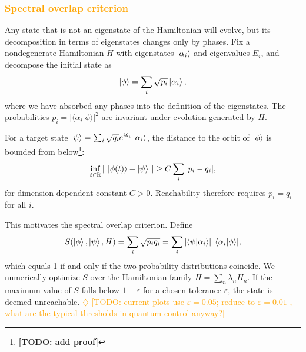 \documentclass[aps,prx,reprint,superscriptaddress,footnote, twocolumn,notitlepage]{revtex4-2}
\newcommand{\ko}[1]{\textcolor{orange}{#1}}
\newcommand{\todoko}[1]{\ko{$\diamondsuit$ #1}}
\begin{document}

\subsubsection{\ko{Spectral overlap criterion}}
Any state that is not an eigenstate of the Hamiltonian will evolve, but its decomposition in terms of eigenstates changes only by phases. Fix a nondegenerate Hamiltonian $H$ with eigenstates $\ket{\alpha_i}$ and eigenvalues $E_i$, and decompose the initial state as
\begin{equation}
    \ket{\phi} = \sum_i \sqrt{p_i} \ket{\alpha_i},
\end{equation}
where we have absorbed any phases into the definition of the eigenstates. The probabilities $p_i = |\langle \alpha_i | \phi \rangle|^2$ are invariant under evolution generated by $H$.

For a target state $\ket{\psi} = \sum_i \sqrt{q_i} e^{i\theta_i} \ket{\alpha_i}$, the distance to the orbit of $\ket{\phi}$ is bounded from below\footnote{\textbf{[TODO: add proof]}}:
\begin{equation}
    \inf_{t \in \mathbb{R}} \| \ket{\phi(t)} - \ket{\psi} \| \geq C \sum_i |p_i - q_i|,
\end{equation}
for dimension-dependent constant $C > 0$. Reachability therefore requires $p_i = q_i$ for all $i$.

This motivates the spectral overlap criterion. Define
\begin{equation}
    S(\ket{\phi}, \ket{\psi}, H) = \sum_i \sqrt{p_i q_i} = \sum_i |\langle \psi | \alpha_i \rangle| \, |\langle \alpha_i | \phi \rangle|,
\end{equation}
which equals 1 if and only if the two probability distributions coincide. We numerically optimize $S$ over the Hamiltonian family $H = \sum_n \lambda_n H_n$. If the maximum value of $S$ falls below $1 - \varepsilon$ for a chosen tolerance $\varepsilon$, the state is deemed unreachable. \todoko{[TODO: current plots use $\varepsilon = 0.05$; reduce to $\varepsilon = 0.01$ , what are the typical thresholds in quantum control anyway?]}
\end{document}
